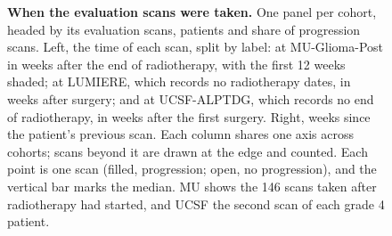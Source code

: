 \begin{figure}[!htbp]
\centering
{}
\caption{\textbf{When the evaluation scans were taken.} One panel per cohort, headed by its evaluation scans,
patients and share of progression scans. Left, the time of each scan, split by label: at MU-Glioma-Post in weeks
after the end of radiotherapy, with the first 12 weeks shaded; at LUMIERE, which records no radiotherapy dates, in
weeks after surgery; and at UCSF-ALPTDG, which records no end of radiotherapy, in weeks after the first surgery.
Right, weeks since the patient's previous scan. Each column shares one axis across cohorts; scans beyond it are drawn
at the edge and counted. Each point is one scan (filled, progression; open, no progression), and the vertical bar
marks the median. MU shows the 146 scans taken after radiotherapy had started, and UCSF the second scan of each grade 4
patient.}
\label{fig:cohorts}
\end{figure}

